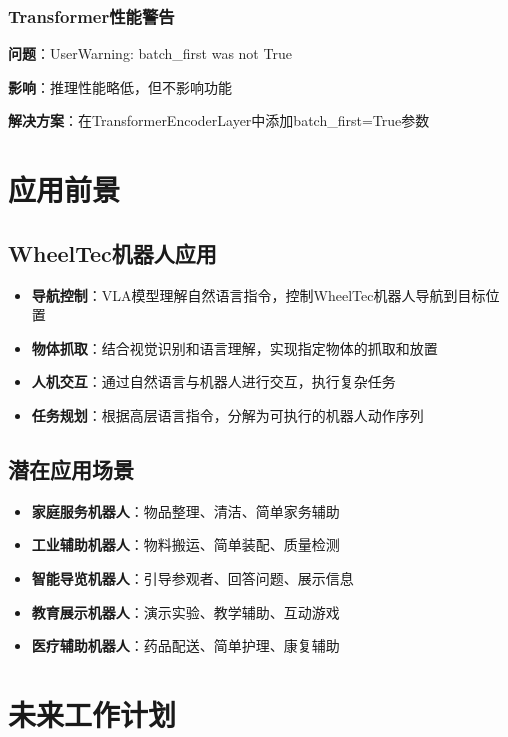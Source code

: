 \documentclass[12pt,a4paper]{article}
\begin{document}
\subsubsection{Transformer性能警告}

\textbf{问题}：UserWarning: batch\_first was not True

\textbf{影响}：推理性能略低，但不影响功能

\textbf{解决方案}：在TransformerEncoderLayer中添加batch\_first=True参数

\section{应用前景}

\subsection{WheelTec机器人应用}

\begin{itemize}
    \item \textbf{导航控制}：VLA模型理解自然语言指令，控制WheelTec机器人导航到目标位置
    \item \textbf{物体抓取}：结合视觉识别和语言理解，实现指定物体的抓取和放置
    \item \textbf{人机交互}：通过自然语言与机器人进行交互，执行复杂任务
    \item \textbf{任务规划}：根据高层语言指令，分解为可执行的机器人动作序列
\end{itemize}

\subsection{潜在应用场景}

\begin{itemize}
    \item \textbf{家庭服务机器人}：物品整理、清洁、简单家务辅助
    \item \textbf{工业辅助机器人}：物料搬运、简单装配、质量检测
    \item \textbf{智能导览机器人}：引导参观者、回答问题、展示信息
    \item \textbf{教育展示机器人}：演示实验、教学辅助、互动游戏
    \item \textbf{医疗辅助机器人}：药品配送、简单护理、康复辅助
\end{itemize}

\section{未来工作计划}
\end{document}
